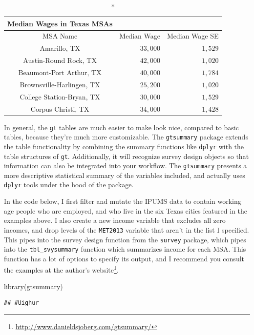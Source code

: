\documentclass[
]{article}
\newenvironment{Shaded}{\begin{snugshade}}{\end{snugshade}}
\newcommand{\FunctionTok}[1]{\textcolor[rgb]{0.00,0.00,0.00}{#1}}
\newcommand{\NormalTok}[1]{#1}
\begin{document}
\captionsetup[table]{labelformat=empty,skip=1pt}
\begin{longtable}{crr}
\caption*{
{\large Median Wages in Texas MSAs}
} \\ 
\toprule
MSA Name & Median Wage & Median Wage SE \\ 
\midrule
Amarillo, TX & $33,000$ & $1,529$ \\ 
Austin-Round Rock, TX & $42,000$ & $1,020$ \\ 
Beaumont-Port Arthur, TX & $40,000$ & $1,784$ \\ 
Brownsville-Harlingen, TX & $25,200$ & $1,020$ \\ 
College Station-Bryan, TX & $30,000$ & $1,529$ \\ 
Corpus Christi, TX & $34,000$ & $1,428$ \\ 
\bottomrule
\end{longtable}

In general, the \texttt{gt} tables are much easier to make look nice, compared to basic tables, because they're much more customizable. The \texttt{gtsummary} package extends the table functionality by combining the summary functions like \texttt{dplyr} with the table structures of \texttt{gt}. Additionally, it will recognize survey design objects so that information can also be integrated into your workflow. The \texttt{gtsummary} presents a more descriptive statistical summary of the variables included, and actually uses \texttt{dplyr} tools under the hood of the package.

In the code below, I first filter and mutate the IPUMS data to contain working age people who are employed, and who live in the six Texas cities featured in the examples above. I also create a new income variable that excludes all zero incomes, and drop levels of the \texttt{MET2013} variable that aren't in the list I specified. This pipes into the survey design function from the \texttt{survey} package, which pipes into the \texttt{tbl\_svysummary} function which summarizes income for each MSA. This function has a lot of options to specify its output, and I recommend you consult the examples at the author's website\footnote{\url{http://www.danieldsjoberg.com/gtsummary/}}.

\begin{Shaded}
\begin{Highlighting}[]
\FunctionTok{library}\NormalTok{(gtsummary)}
\end{Highlighting}
\end{Shaded}

\begin{verbatim}
## #Uighur
\end{verbatim}
\end{document}
